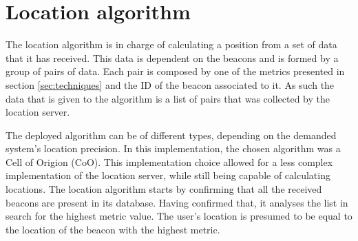\section{Location algorithm} 
\label{sec:algos} 
 
 
The location algorithm is in charge of calculating a position from a set of data that it has received. This data is dependent on the beacons and is formed by a group of pairs of data. Each pair is composed by one of the metrics presented in section \ref{sec:techniques} and the ID of the beacon associated to it. As such the data that is given to the algorithm is a list of pairs that was collected by the location server. 
 
 
The deployed algorithm can be of different types, depending on the demanded system's location precision. In this implementation, the chosen algorithm was a Cell of Origion (CoO). This implementation choice allowed for a less complex implementation of the location server, while still being capable of calculating locations. The location algorithm starts by confirming that all the received beacons are present in its database. Having confirmed that, it analyses the list in search for the highest metric value. The user's location is presumed to be equal to the location of the beacon with the highest metric. 
 